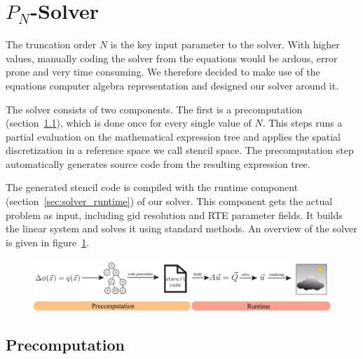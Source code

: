 

\section{$P_N$-Solver}
\label{sec:pnsolver}

The truncation order $N$ is the key input parameter to the solver. With higher values, manually coding the solver from the equations would be ardous, error prone and very time consuming. We therefore decided to make use of the equations computer algebra representation and designed our solver around it.

The solver consists of two components. The first is a precomputation (section~\ref{sec:solver_precomputation}), which is done once for every single value of $N$. This steps runs a partial evaluation on the mathematical expression tree and applies the spatial discretization in a reference space we call stencil space. The precomputation step automatically generates source code from the resulting expression tree.

The generated stencil code is compiled with the runtime component (section~\ref{sec:solver_runtime}) of our solver. This component gets the actual problem as input, including gid resolution and RTE parameter fields. It builds the linear system and solves it using standard methods. An overview of the solver is given in figure~\ref{fig:pnsolver}.

\begin{figure}[t!]
\centering
\includegraphics[width=\textwidth]{figures/fig_pipeline.pdf}
\vspace{-0.2in}
\label{fig:pnsolver}
\end{figure}

\subsection{Precomputation}
\label{sec:solver_precomputation}

